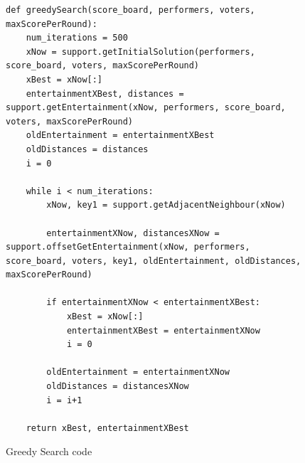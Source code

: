 \documentclass[12pt]{report}
\begin{document}
\begin{figure}[H]
\caption{Greedy Search code}
\label{greedyCode}
\begin{lstlisting}
def greedySearch(score_board, performers, voters, maxScorePerRound):
    num_iterations = 500
    xNow = support.getInitialSolution(performers, score_board, voters, maxScorePerRound)
    xBest = xNow[:]
    entertainmentXBest, distances = support.getEntertainment(xNow, performers, score_board, voters, maxScorePerRound)
    oldEntertainment = entertainmentXBest
    oldDistances = distances
    i = 0
    
    while i < num_iterations:
        xNow, key1 = support.getAdjacentNeighbour(xNow)
        
        entertainmentXNow, distancesXNow = support.offsetGetEntertainment(xNow, performers, score_board, voters, key1, oldEntertainment, oldDistances, maxScorePerRound)
        
        if entertainmentXNow < entertainmentXBest:
            xBest = xNow[:]
            entertainmentXBest = entertainmentXNow
            i = 0
        
        oldEntertainment = entertainmentXNow
        oldDistances = distancesXNow
        i = i+1

    return xBest, entertainmentXBest\end{lstlisting}
\end{figure}
\end{document}
